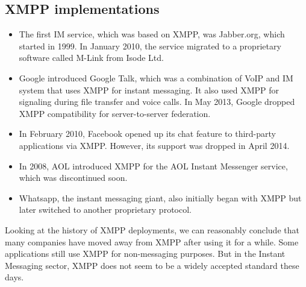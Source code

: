 \documentclass[12pt, conference, a4paper]{article}
\begin{document}
\subsection{XMPP implementations}
\begin{itemize}
\item The first IM service, which was based on XMPP, was Jabber.org, which started in 1999. In January 2010, the service migrated to a proprietary software called M-Link from Isode Ltd.
\item Google introduced Google Talk, which was a combination of VoIP and IM system that uses XMPP for instant messaging. It also used XMPP for signaling during file transfer and voice calls. In May 2013, Google dropped XMPP compatibility for server-to-server federation.
\item In February 2010, Facebook opened up its chat feature to third-party applications via XMPP. However, its support was dropped in April 2014.
\item In 2008, AOL introduced XMPP for the AOL Instant Messenger service, which was discontinued soon.
\item Whatsapp, the instant messaging giant, also initially began with XMPP but later switched to another proprietary protocol. \cite{xmpp-whatsapp}
\end{itemize}
Looking at the history of XMPP deployments, we can reasonably conclude that many companies have moved away from XMPP after using it for a while. Some applications still use XMPP for non-messaging purposes. But in the Instant Messaging sector, XMPP does not seem to be a widely accepted standard these days.
\end{document}
